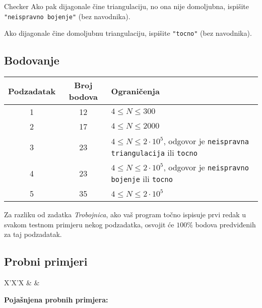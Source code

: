 \begin{statement}[
  problempoints=110,
  timelimit=3 sekunde,
  memorylimit=512 MiB,
]{Checker}
Ako pak dijagonale čine triangulaciju, no ona nije domoljubna, ispišite
\texttt{"neispravno bojenje"} (bez navodnika).

Ako dijagonale čine domoljubnu triangulaciju, ispišite \texttt{"tocno"}
(bez navodnika).

\subsection*{Bodovanje}
{\renewcommand{\arraystretch}{1.4}
  \setlength{\tabcolsep}{6pt}
  \begin{tabular}{ccl}
 Podzadatak & Broj bodova & Ograničenja \\ \midrule
  1 & 12 & $4 \le N \le 300$ \\
  2 & 17 & $4 \le N \le 2000$ \\
    3 & 23 & $4 \le N \le 2\cdot10^5$, odgovor je \texttt{neispravna triangulacija} ili \texttt{tocno} \\
    4 & 23 & $4 \le N \le 2\cdot10^5$, odgovor je \texttt{neispravno bojenje} ili \texttt{tocno} \\
  5 & 35 & $4 \le N \le 2\cdot10^5$
\end{tabular}}

Za razliku od zadatka \textit{Trobojnica}, ako vaš program točno ispisuje prvi redak u
svakom testnom primjeru nekog podzadatka, osvojit će $100\%$ bodova predviđenih
za taj podzadatak.

\subsection*{Probni primjeri}
\begin{tabularx}{\textwidth}{X'X'X}
 &
 &
\end{tabularx}


\textbf{Pojašnjena probnih primjera:}

\end{statement}
